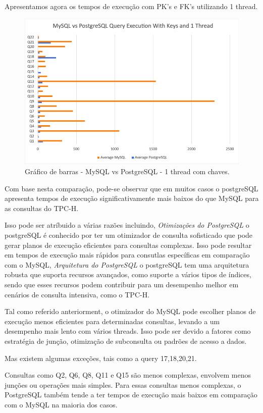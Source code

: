 \documentclass{article}
\begin{document}
Apresentamos agora os tempos de execução com PK's e FK's utilizando 1 thread.
\begin{figure}[H]
  \centering
  \includegraphics[width=\textwidth]{Graphs/mysqlvspostgresql_withkeys_onethread.png}
  \caption{Gráfico de barras - MySQL vs PostgreSQL - 1 thread com chaves.}
  \label{fig:PKCreation2}
\end{figure}
\quad Com base nesta comparação, pode-se observar que em muitos casos o postgreSQL apresenta tempos de execução significativamente mais baixos do que MySQL para as consultas do TPC-H.

Isso pode ser atríbuido a várias razões incluindo, \textit{Otimizações do PostgreSQL} o postgreSQL é conhecido por ter um otimizador de consulta sofisticado que pode gerar planos de execução eficientes para consultas complexas. Isso pode resultar em tempos de execução mais rápidos para consutlas específicas em comparação com o MySQL, \textit{Arquitetura do PostgreSQL} o postgreSQL tem uma arquitetura robusta que suporta recursos avançados, como suporte a vários tipos de índices, sendo que esses recursos podem contribuir para um desempenho melhor em cenários de consulta intensiva, como o TPC-H.

Tal como referido anteriorment, o otimizador do MySQL pode escolher planos de execução menos eficientes para determinadas consultas, levando a um desempenho mais lento com vários threads. Isso pode ser devido a fatores como estratégia de junção, otimização de subconsulta ou padrões de acesso a dados. 


\quad Mas existem algumas exceções, tais como a query 17,18,20,21.

Consultas como Q2, Q6, Q8, Q11 e Q15 são menos complexas, envolvem menos junções ou operações mais simples.
Para essas consultas menos complexas, o PostgreSQL também tende a ter tempos de execução mais baixos em comparação com o MySQL na maioria dos casos.
\end{document}
